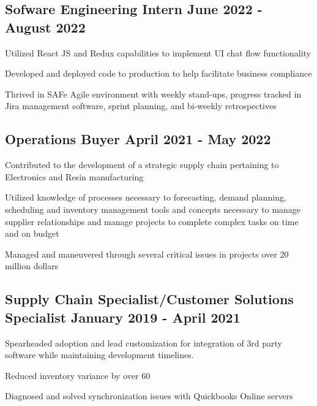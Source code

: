 \subsection{{Sofware Engineering Intern \hfill June 2022 - August 2022}}
\begin{zitemize}
\item Utilized React JS and Redux capabilities to implement UI chat flow functionality
\item Developed and deployed code to production to help facilitate business compliance
\item Thrived in SAFe Agile environment with weekly stand-ups, progress tracked in Jira management software, sprint planning, and bi-weekly retrospectives
\end{zitemize}

\subsection{{Operations Buyer \hfill April 2021 - May 2022}}
\begin{zitemize}
\item Contributed to the development of a strategic supply chain pertaining to Electronics and Resin manufacturing
\item Utilized knowledge of processes necessary to forecasting, demand planning, scheduling and inventory management tools and concepts necessary to manage supplier relationships and manage projects to complete complex tasks on time and on budget
\item Managed and maneuvered through several critical issues in projects over 20 million dollars
\end{zitemize}

\subsection{{Supply Chain Specialist/Customer Solutions Specialist \hfill January 2019 - April 2021}}
\begin{zitemize}
\item Spearheaded adoption and lead customization for integration of 3rd party software while maintaining development timelines.
\item Reduced inventory variance by over 60%
\item Diagnosed and solved synchronization issues with Quickbooks Online servers
\end{zitemize}

